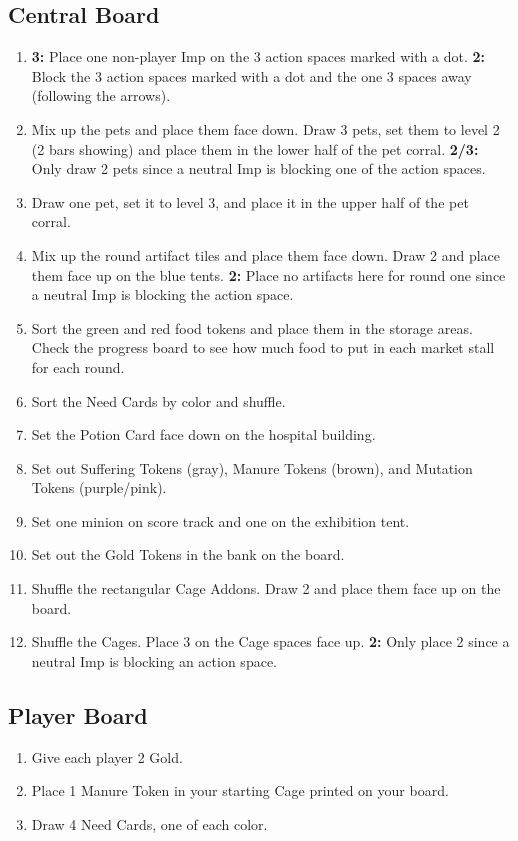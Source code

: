 \documentclass[12pt]{article}
\newenvironment{enumerateCustom}
{\begin{enumerate}
  \setlength{\itemsep}{1pt}
  \setlength{\parskip}{0pt}
  \setlength{\parsep}{0pt}}
{\end{enumerate}}
\begin{document}
\begin{mdframed}[style = customFrame]
\begin{multicols*}{2}
\subsection*{Central Board}
\begin{enumerateCustom}
	\item \textbf{3:} Place one non-player Imp on the 3 action spaces marked with a dot. \textbf{2:} Block the 3 action spaces marked with a dot and the one 3 spaces away (following the arrows).
	\item Mix up the pets and place them face down. Draw 3 pets, set them to level 2 (2 bars showing) and place them in the lower half of the pet corral. \textbf{2/3:} Only draw 2 pets since a neutral Imp is blocking one of the action spaces.
	\item Draw one pet, set it to level 3, and place it in the upper half of the pet corral.
	\item Mix up the round artifact tiles and place them face down. Draw 2 and place them face up on the blue tents. \textbf{2:} Place no artifacts here for round one since a neutral Imp is blocking the action space.
	\item Sort the green and red food tokens and place them in the storage areas. Check the progress board to see how much food to put in each market stall for each round.
	\item Sort the Need Cards by color and shuffle.
	\item Set the Potion Card face down on the hospital building.
	\item Set out Suffering Tokens (gray), Manure Tokens (brown), and Mutation Tokens (purple/pink).
	\item Set one minion on score track and one on the exhibition tent.
	\item Set out the Gold Tokens in the bank on the board.
	\item Shuffle the rectangular Cage Addons. Draw 2 and place them face up on the board.
	\item Shuffle the Cages. Place 3 on the Cage spaces face up. \textbf{2:} Only place 2 since a neutral Imp is blocking an action space.
\end{enumerateCustom}

\subsection*{Player Board}
\begin{enumerateCustom}
	\item Give each player 2 Gold.
	\item Place 1 Manure Token in your starting Cage printed on your board.
	\item Draw 4 Need Cards, one of each color.
\end{enumerateCustom}


\end{multicols*}
\end{mdframed}
\end{document}
